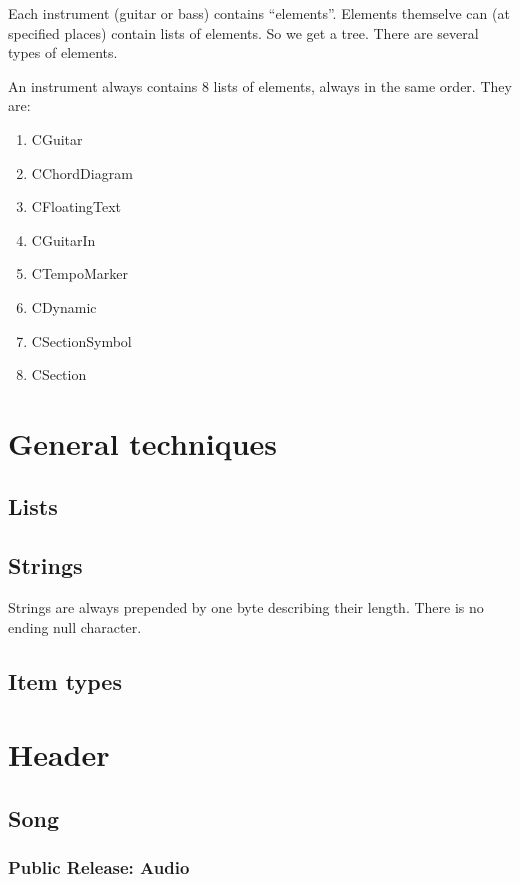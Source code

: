 \documentclass[a4paper]{article}
\begin{document}
Each instrument (guitar or bass) contains ``elements''. Elements themselve can 
(at specified places) contain lists of elements. So we get a tree. 
There are several types of elements.

An instrument always contains 8 lists of elements, always in the same order.
They are:

\begin{enumerate}
\item CGuitar
\item CChordDiagram
\item CFloatingText
\item CGuitarIn
\item CTempoMarker
\item CDynamic
\item CSectionSymbol
\item CSection
\end{enumerate}

\section{General techniques}

\subsection{Lists}

\subsection{Strings}

Strings are always prepended by one byte describing their length. There is 
no ending null character.

\subsection{Item types}

\section{Header}

\subsection{Song}

\subsubsection{Public Release: Audio}
\end{document}
